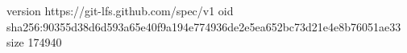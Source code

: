 version https://git-lfs.github.com/spec/v1
oid sha256:90355d38d6d593a65e40f9a194e774936de2e5ea652bc73d21e4e8b76051ae33
size 174940
